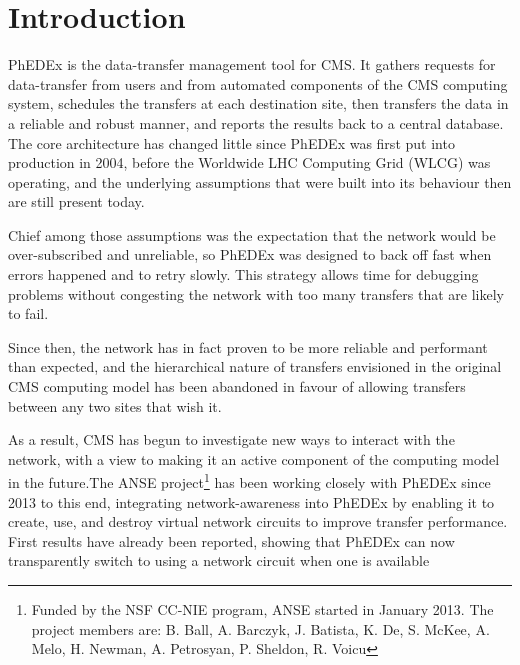 \section{Introduction}

PhEDEx\cite{PhEDEx} is the data-transfer management tool for CMS. It gathers requests for data-transfer from users and from automated components of the CMS computing system, schedules the transfers at each destination site, then transfers the data in a reliable and robust manner, and reports the results back to a central database. The core architecture has changed little since PhEDEx was first put into production in 2004, before the Worldwide LHC Computing Grid (WLCG\cite{WLCG}) was operating, and the underlying assumptions that were built into its behaviour then are still present today.

Chief among those assumptions was the expectation that the network would be over-subscribed and unreliable, so PhEDEx was designed to back off fast when errors happened and to retry slowly. This strategy allows time for debugging problems without congesting the network with too many transfers that are likely to fail.

Since then, the network has in fact proven to be more reliable and performant than expected, and the hierarchical nature of transfers envisioned in the original CMS computing model\cite{CompModel} has been abandoned in favour of allowing transfers between any two sites that wish it\cite{T2Traffic}.

As a result, CMS has begun to investigate new ways to interact with the network, with a view to making it an active component of the computing model in the future\cite{NetworkAwarenessinCMS}.The ANSE project\cite{ANSE}\footnote{Funded by the NSF CC-NIE program, ANSE started in January 2013. The project members are: B. Ball, A. Barczyk, J. Batista, K. De, S. McKee, A. Melo, H. Newman, A. Petrosyan, P. Sheldon, R. Voicu} has been working closely with PhEDEx since 2013 to this end, integrating network-awareness into PhEDEx by enabling it to create, use, and destroy virtual network circuits to improve transfer performance. First results have already been reported, showing that PhEDEx can now transparently switch to using a network circuit when one is available\cite{ANSE_ISGC_2014}